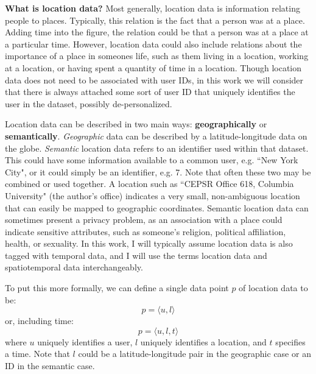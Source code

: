 \textbf{What is location data?}
Most generally, location data is information relating people to places.
Typically, this relation is the fact that a person was at a place.
Adding time into the figure, the relation could be that a person was at a place at a particular time.
However, location data could also include relations about the importance of a place in someones life, such as them living in a location, working at a location, or having spent a quantity of time in a location.
Though location data does not need to be associated with user IDs, in this work we will consider that there is always attached some sort of user ID that uniquely identifies the user in the dataset, possibly de-personalized.

Location data can be described in two main ways: \textbf{geographically} or \textbf{semantically}.
\emph{Geographic} data can be described by a latitude-longitude data on the globe.
\emph{Semantic} location data refers to an identifier used within that dataset.
This could have some information available to a common user, e.g. ``New York City", or it could simply be an identifier, e.g. 7.
Note that often these two may be combined or used together.
A location such as ``CEPSR Office 618, Columbia University" (the author's office) indicates a very small, non-ambiguous location that can easily be mapped to geographic coordinates.
Semantic location data can sometimes present a privacy problem, as an association with a place could indicate sensitive attributes, such as someone's religion, political affiliation, health, or sexuality.
In this work, I will typically assume location data is also tagged with temporal data, and I will use the terms location data and spatiotemporal data interchangeably.

To put this more formally, we can define a single data point $p$ of location data to be:
\[ p = \langle u, l \rangle \]
or, including time:
\[ p = \langle u, l, t \rangle \]
where $u$ uniquely identifies a user, $l$ uniquely identifies a location, and $t$ specifies a time.
Note that $l$ could be a latitude-longitude pair in the geographic case or an ID in the semantic case.

